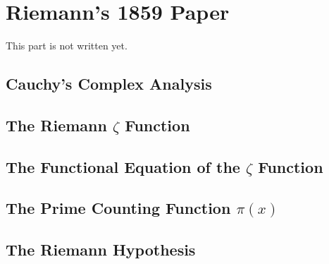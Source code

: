 \chapter{Riemann's 1859 Paper}

This part is not written yet. \\

\td 

\section{Cauchy's Complex Analysis}

\section{The Riemann $\zeta$ Function}

\section{The Functional Equation of the $\zeta$ Function}

\section{The Prime Counting Function $\pi(x)$}

\section{The Riemann Hypothesis}